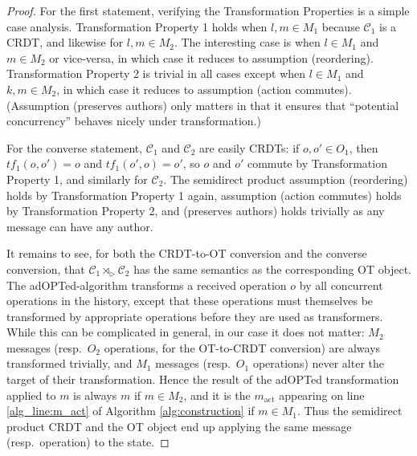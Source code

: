 \documentclass[acmsmall,nonacm,12pt]{acmart}
\newcommand{\mc}[1]{\ensuremath{\mathcal{#1}}}
\newcommand{\act}{\triangleright}
\theoremstyle{plain}
\theoremstyle{definition}
\begin{document}
\begin{proof}
For the first statement, verifying the Transformation Properties is a simple case analysis.  Transformation Property 1 holds when $l, m \in M_1$ because $\mc{C}_1$ is a CRDT, and likewise for $l, m \in M_2$.  The interesting case is when $l \in M_1$ and $m \in M_2$ or vice-versa, in which case it reduces to assumption (reordering).  Transformation Property 2 is trivial in all cases except when $l \in M_1$ and $k,m \in M_2$, in which case it reduces to assumption (action commutes).  (Assumption (preserves authors) only matters in that it ensures that ``potential concurrency'' behaves nicely under transformation.)

For the converse statement, $\mc{C}_1$ and $\mc{C}_2$ are easily CRDTs: if $o, o' \in O_1$, then $tf_1(o, o') = o$ and $tf_1(o', o) = o'$, so $o$ and $o'$ commute by Transformation Property 1, and similarly for $\mc{C}_2$.  The semidirect product assumption (reordering) holds by Transformation Property 1 again, assumption (action commutes) holds by Transformation Property 2, and (preserves authors) holds trivially as any message can have any author.

It remains to see, for both the CRDT-to-OT conversion and the converse conversion, that $\mc{C}_1 \rtimes_\act \mc{C}_2$ has the same semantics as the corresponding OT object.  The adOPTed-algorithm transforms a received operation $o$ by all concurrent operations in the history, except that these operations must themselves be transformed by appropriate operations before they are used as transformers.  While this can be complicated in general, in our case it does not matter: $M_2$ messages (resp.\ $O_2$ operations, for the OT-to-CRDT conversion) are always transformed trivially, and $M_1$ messages (resp.\ $O_1$ operations) never alter the target of their transformation.  Hence the result of the adOPTed transformation applied to $m$ is always $m$ if $m \in M_2$, and it is the $m_{\text{act}}$ appearing on line \ref{alg_line:m_act} of Algorithm \ref{alg:construction} if $m \in M_1$.  Thus the semidirect product CRDT and the OT object end up applying the same message (resp.\ operation) to the state. 
\end{proof}
\end{document}
